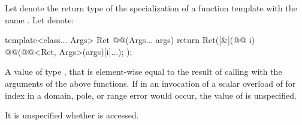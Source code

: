 \begin{itemdescr}
\pnum
Let  denote the return type of the specialization of a function
template with the name .
Let  denote:
\begin{codeblock}
template<class... Args>
Ret @@(Args... args) {
  return Ret([&](@@ i) {
      @@(@@<Ret, Args>(args)[i]...);
  });
}
\end{codeblock}

\pnum
\returns
A value  of type , that is element-wise equal to the
result of calling  with the arguments of the above
functions.
If in an invocation of a scalar overload of  for index
 in  a domain, pole, or range error would
occur, the value of  is unspecified.

\pnum
\remarks
It is unspecified whether  is accessed.
\end{itemdescr}

